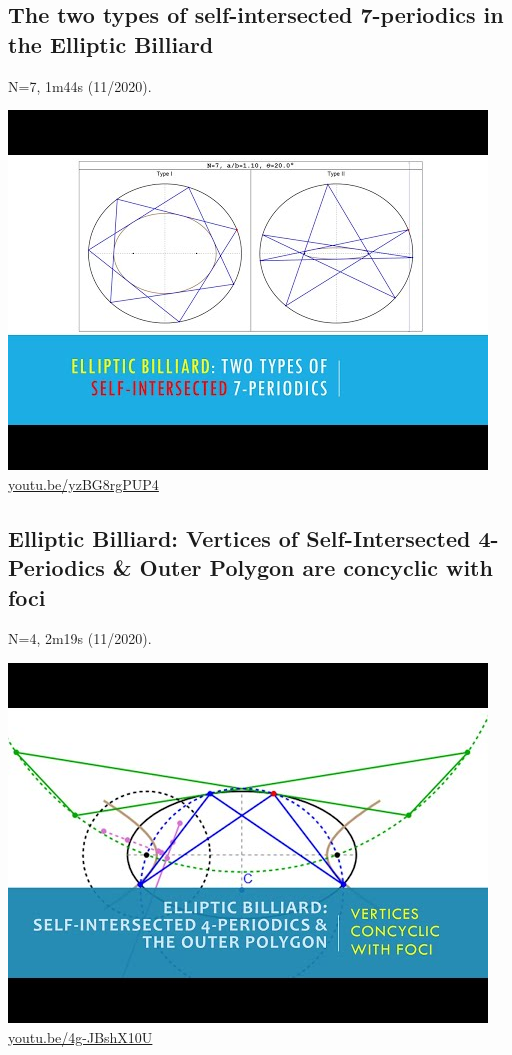 \documentclass[12pt]{amsart}
\begin{document}
\subsection{The two types of self-intersected 7-periodics in the Elliptic Billiard}
\label{vid:yzBG8rgPUP4}
\noindent N=7, 1m44s (11/2020). 
\begin{center}\includegraphics[width=.5\textwidth]{pics/yzBG8rgPUP4.jpg} \\ 
\href{https://youtu.be/yzBG8rgPUP4}{\url{youtu.be/yzBG8rgPUP4}}\end{center}
% 

\subsection{Elliptic Billiard: Vertices of Self-Intersected 4-Periodics \& Outer Polygon are concyclic with foci}
\label{vid:4g-JBshX10U}
\noindent N=4, 2m19s (11/2020). 
\begin{center}\includegraphics[width=.5\textwidth]{pics/4g-JBshX10U.jpg} \\ 
\href{https://youtu.be/4g-JBshX10U}{\url{youtu.be/4g-JBshX10U}}\end{center}
% 
\end{document}
